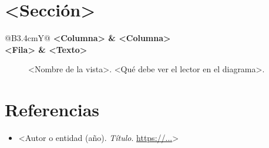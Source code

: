 \documentclass[11pt,a4paper]{article}
\begin{document}
\section{<Sección>}

\begin{table}[H]
\caption{<Qué muestra la tabla, en una oración>.}
\small
\begin{tabularx}{\linewidth}{@{}B{3.4cm}Y@{}}
\toprule
\normalfont\bfseries <Columna> & \textbf{<Columna>} \\
\midrule
<Fila> & <Texto> \\
\bottomrule
\end{tabularx}
\end{table}

\begin{figure}[H]
\centering
{}
\caption{<Nombre de la vista>. <Qué debe ver el lector en el diagrama>.}
\end{figure}

\section*{Referencias}
\small
\begin{itemize}[leftmargin=1.2em]
  \item <Autor o entidad (año). \emph{Título}. \url{https://...}>
\end{itemize}
\end{document}
